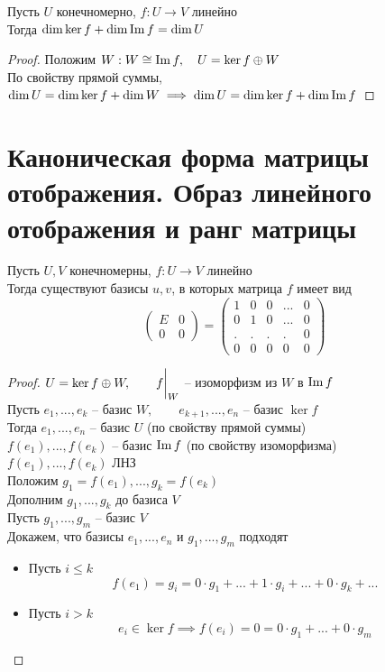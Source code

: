 \begin{theorem}
	Пусть $ U $ конечномерно, $ f : U \to V $ линейно \\
    Тогда $ \dim \ker f + \dim \operatorname{Im} f = \dim U $
\end{theorem}

\begin{proof}
    Положим $ W : W \cong \operatorname{Im} f, \quad U = \ker f \oplus W $ \\
    По свойству прямой суммы, $ \dim U = \dim \ker f + \dim W \implies \dim U = \dim \ker f + \dim \operatorname{Im} f $
\end{proof}

\section{Каноническая форма матрицы отображения. Образ линейного отображения и ранг матрицы}

\begin{theorem}
	Пусть $ U, V $ конечномерны, $ f : U \to V $ линейно \\
    Тогда существуют базисы $ u, v $, в которых матрица $ f $ имеет вид
    $$
    \begin{pmatrix}
        E & 0 \\
        0 & 0
    \end{pmatrix} =
    \begin{pmatrix}
    	1 & 0 & 0 & ... & 0 \\
        0 & 1 & 0 & ... & 0 \\
        . & . & . & . & 0 \\
        0 & 0 & 0 & 0 & 0
    \end{pmatrix} $$
\end{theorem}

\begin{proof}
    $ U = \ker f \oplus W, \qquad f \bigg|_{W}^{} $ -- изоморфизм из $ W $ в $ \operatorname{Im} f $ \\
    Пусть $ e_1, ..., e_k $ -- базис $ W, \qquad e_{k + 1}, ..., e_n $ -- базис $ \ker f $ \\
    Тогда $ e_1, ..., e_n $ -- базис $ U $ (по свойству прямой суммы) \\
    $ f(e_1), ..., f(e_k) $ -- базис $ \operatorname{Im} f $ (по свойству изоморфизма) \\
    $ f(e_1), ..., f(e_k) $ ЛНЗ \\
    Положим $ g_1 = f(e_1), ..., g_k = f(e_k) $ \\
    Дополним $ g_1, ..., g_k $ до базиса $ V $ \\
    Пусть $ g_1, ..., g_m $ -- базис $ V $ \\
    Докажем, что базисы $ e_1, ..., e_n $ и $ g_1, ..., g_m $ подходят
    \begin{itemize}
    	\item Пусть $ i \le k $
        $$ f(e_1) = g_i = 0 \cdot g_1 + ... + 1 \cdot g_i + ... + 0 \cdot g_k + ... $$
        \item Пусть $ i > k $
        $$ e_i \in \ker f \implies f(e_i) = 0 = 0 \cdot g_1 + ... + 0 \cdot g_m $$
    \end{itemize}
\end{proof}

